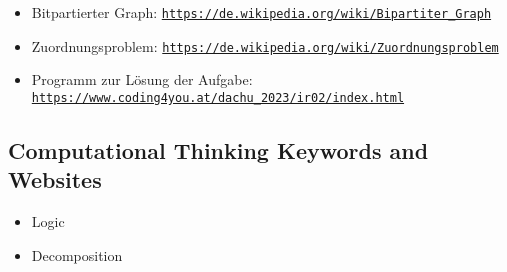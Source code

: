 \documentclass[a4paper,11pt]{report}
\newcommand{\BrochureUrlText}[1]{\texttt{#1}}
\begin{document}
\begin{itemize}
  \item Bitpartierter Graph: \href{https://de.wikipedia.org/wiki/Bipartiter_Graph}{\BrochureUrlText{https://de.wikipedia.org/wiki/Bipartiter\_Graph}}
  \item Zuordnungsproblem: \href{https://de.wikipedia.org/wiki/Zuordnungsproblem}{\BrochureUrlText{https://de.wikipedia.org/wiki/Zuordnungsproblem}}
  \item Programm zur Lösung der Aufgabe: \href{https://www.coding4you.at/dachu_2023/ir02/index.html}{\BrochureUrlText{https://www.coding4you.at/dachu\_2023/ir02/index.html}}
\end{itemize}


\subsection*{Computational Thinking Keywords and Websites}

\begin{itemize}
  \item Logic
  \item Decomposition
\end{itemize}
\end{document}
